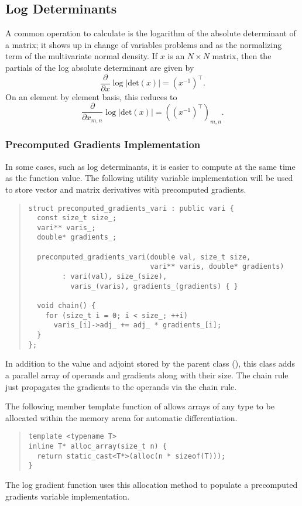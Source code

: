 \documentclass[10pt]{article}
\begin{document}
\subsection{Log Determinants}

A common operation to calculate is the logarithm of the absolute
determinant of a matrix; it shows up in change of variables problems
and as the normalizing term of the multivariate normal density.  If
$x$ is an $N \times N$ matrix, then the partials of the log absolute
determinant are given by
\[
\frac{\partial}{\partial x} \log | \mbox{det}(x) |
= \left( x^{-1} \right)^{\top}.
\]
On an element by element basis, this reduces to
\[
\frac{\partial}{\partial x_{m,n}} \log | \mbox{det}(x) |
= \left( \left( x^{-1} \right)^{\top}\right)_{m,n}.
\]

\subsubsection{Precomputed Gradients Implementation}

In some cases, such as log determinants, it is easier to compute at
the same time as the function value.  The following utility variable
implementation will be used to store vector and matrix derivatives
with precomputed gradients.
%
\begin{quote}
\begin{Verbatim}
struct precomputed_gradients_vari : public vari {
  const size_t size_;
  vari** varis_;
  double* gradients_;

  precomputed_gradients_vari(double val, size_t size, 
                             vari** varis, double* gradients)
        : vari(val), size_(size),
          varis_(varis), gradients_(gradients) { }

  void chain() {
    for (size_t i = 0; i < size_; ++i) 
      varis_[i]->adj_ += adj_ * gradients_[i];
  }
};
\end{Verbatim}
\end{quote}
%
In addition to the value and adjoint stored by the parent class
(), this class adds a parallel array of operands and
gradients along with their size.  The chain rule just propagates the
gradients to the operands via the chain rule.

The following member template function of  allows
arrays of any type to be allocated within the memory arena for
automatic differentiation.
%
\begin{quote}
\begin{Verbatim}
template <typename T>
inline T* alloc_array(size_t n) {
  return static_cast<T*>(alloc(n * sizeof(T)));
}
\end{Verbatim}
\end{quote}
%
The log gradient function uses this allocation method to populate a
precomputed gradients variable implementation.
\end{document}
